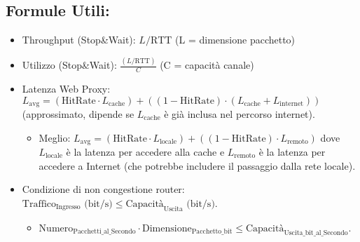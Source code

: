 \subsection{Formule Utili:}
\begin{itemize}
    \item Throughput (Stop\&Wait): $L / \text{RTT}$ (L = dimensione pacchetto)
    \item Utilizzo (Stop\&Wait): $\frac{(L/\text{RTT})}{C}$ (C = capacità canale)
    \item Latenza Web Proxy: $L_{\text{avg}} = (\text{HitRate} \cdot L_{\text{cache}}) + ((1 - \text{HitRate}) \cdot (L_{\text{cache}} + L_{\text{internet}}))$ (approssimato, dipende se $L_{\text{cache}}$ è già inclusa nel percorso internet).
    \begin{itemize}
        \item Meglio: $L_{\text{avg}} = (\text{HitRate} \cdot L_{\text{locale}}) + ((1 - \text{HitRate}) \cdot L_{\text{remoto}})$ dove $L_{\text{locale}}$ è la latenza per accedere alla cache e $L_{\text{remoto}}$ è la latenza per accedere a Internet (che potrebbe includere il passaggio dalla rete locale).
    \end{itemize}
    \item Condizione di non congestione router: $\text{Traffico}_{\text{Ingresso}} \text{ (bit/s)} \leq \text{Capacità}_{\text{Uscita}} \text{ (bit/s)}$.
    \begin{itemize}
        \item $\text{Numero}_{\text{Pacchetti\_al\_Secondo}} \cdot \text{Dimensione}_{\text{Pacchetto\_bit}} \leq \text{Capacità}_{\text{Uscita\_bit\_al\_Secondo}}$.
    \end{itemize}
\end{itemize}


